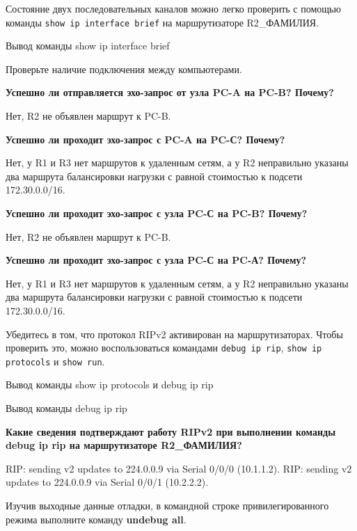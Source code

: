 Состояние двух последовательных каналов можно легко проверить
с помощью команды \texttt{show ip interface brief}
на маршрутизаторе R2\_ФАМИЛИЯ.

\begin{image}
    \caption{Вывод команды show ip interface brief}
\end{image}

Проверьте наличие подключения между компьютерами.

\textbf{Успешно ли отправляется эхо-запрос от узла PC-A на PC-B? Почему?}

Нет, R2 не объявлен маршрут к PC-B.

\textbf{Успешно ли проходит эхо-запрос с PC-A на PC-С? Почему?}

Нет, у R1 и R3 нет маршрутов к удаленным сетям,
а у R2 неправильно указаны два маршрута балансировки нагрузки
с равной стоимостью к подсети 172.30.0.0/16.

\textbf{Успешно ли проходит эхо-запрос с узла PC-С на PC-B? Почему?}

Нет, R2 не объявлен маршрут к PC-B.

\textbf{Успешно ли проходит эхо-запрос с узла PC-С на PC-А? Почему?}

Нет, у R1 и R3 нет маршрутов к удаленным сетям,
а у R2 неправильно указаны два маршрута балансировки нагрузки
с равной стоимостью к подсети 172.30.0.0/16.

Убедитесь в том, что протокол RIPv2 активирован на маршрутизаторах.
Чтобы проверить это, можно воспользоваться командами \texttt{debug ip rip},
\texttt{show ip protocols} и \texttt{show run}.

\begin{image}
    \caption{Вывод команды show ip protocols и debug ip rip}
\end{image}

\begin{image}
    \caption{Вывод команды debug ip rip}
\end{image}

\textbf{Какие сведения подтверждают работу RIPv2
при выполнении команды debug ip rip на маршрутизаторе R2\_ФАМИЛИЯ?}

RIP: sending v2 updates to 224.0.0.9 via Serial 0/0/0 (10.1.1.2).
RIP: sending v2 updates to 224.0.0.9 via Serial 0/0/1 (10.2.2.2).

Изучив выходные данные отладки, в командной строке привилегированного
режима выполните команду \textbf{undebug all}.

